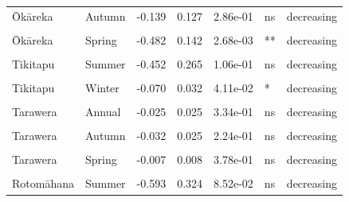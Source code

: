 \documentclass[
  12pt,
  a4paper,
  oneside]{scrbook}
\begin{document}
\begin{longtable}[t]{llrrrll}
Ōkāreka & Autumn & -0.139 & 0.127 & 2.86e-01 & ns & decreasing\\
\cellcolor{gray!8}{Ōkāreka} & \cellcolor{gray!8}{Winter} & \cellcolor{gray!8}{-0.094} & \cellcolor{gray!8}{0.066} & \cellcolor{gray!8}{1.70e-01} & \cellcolor{gray!8}{ns} & \cellcolor{gray!8}{decreasing}\\
Ōkāreka & Spring & -0.482 & 0.142 & 2.68e-03 & ** & decreasing\\
\addlinespace
\cellcolor{gray!8}{Tikitapu} & \cellcolor{gray!8}{Annual} & \cellcolor{gray!8}{-0.255} & \cellcolor{gray!8}{0.115} & \cellcolor{gray!8}{3.92e-02} & \cellcolor{gray!8}{*} & \cellcolor{gray!8}{decreasing}\\
Tikitapu & Summer & -0.452 & 0.265 & 1.06e-01 & ns & decreasing\\
\cellcolor{gray!8}{Tikitapu} & \cellcolor{gray!8}{Autumn} & \cellcolor{gray!8}{-0.145} & \cellcolor{gray!8}{0.205} & \cellcolor{gray!8}{4.90e-01} & \cellcolor{gray!8}{ns} & \cellcolor{gray!8}{decreasing}\\
Tikitapu & Winter & -0.070 & 0.032 & 4.11e-02 & * & decreasing\\
\cellcolor{gray!8}{Tikitapu} & \cellcolor{gray!8}{Spring} & \cellcolor{gray!8}{-0.230} & \cellcolor{gray!8}{0.140} & \cellcolor{gray!8}{1.20e-01} & \cellcolor{gray!8}{ns} & \cellcolor{gray!8}{decreasing}\\
\addlinespace
Tarawera & Annual & -0.025 & 0.025 & 3.34e-01 & ns & decreasing\\
\cellcolor{gray!8}{Tarawera} & \cellcolor{gray!8}{Summer} & \cellcolor{gray!8}{-0.213} & \cellcolor{gray!8}{0.207} & \cellcolor{gray!8}{3.14e-01} & \cellcolor{gray!8}{ns} & \cellcolor{gray!8}{decreasing}\\
Tarawera & Autumn & -0.032 & 0.025 & 2.24e-01 & ns & decreasing\\
\cellcolor{gray!8}{Tarawera} & \cellcolor{gray!8}{Winter} & \cellcolor{gray!8}{-0.027} & \cellcolor{gray!8}{0.085} & \cellcolor{gray!8}{7.51e-01} & \cellcolor{gray!8}{ns} & \cellcolor{gray!8}{decreasing}\\
Tarawera & Spring & -0.007 & 0.008 & 3.78e-01 & ns & decreasing\\
\addlinespace
\cellcolor{gray!8}{Rotomāhana} & \cellcolor{gray!8}{Annual} & \cellcolor{gray!8}{-0.870} & \cellcolor{gray!8}{0.223} & \cellcolor{gray!8}{1.02e-03} & \cellcolor{gray!8}{**} & \cellcolor{gray!8}{decreasing}\\
Rotomāhana & Summer & -0.593 & 0.324 & 8.52e-02 & ns & decreasing\\

\end{longtable}
\end{document}
